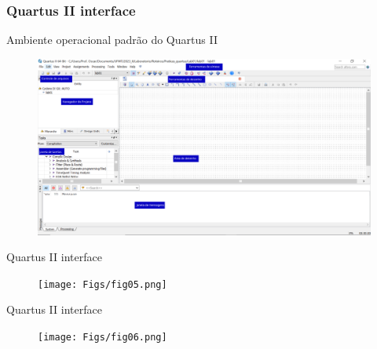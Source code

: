 \documentclass{CPSPresentation}
\begin{document}
\begin{frame}
	\frametitle{Quartus II interface}
	
	\begin{block}{}
		\justifying
		Ambiente operacional padrão do Quartus II
	\end{block}
	
	\begin{figure}[h]
		\centering
		\includegraphics[width=1.02\textwidth]{quartus/fig04.pdf}
	\end{figure}
	
	
\end{frame}
\begin{frame}{Quartus II interface}
	\justifying
	
	\begin{figure}[h]
			\centering
			\texttt{[image: Figs/fig05.png]}
		\end{figure}
	
	
\end{frame}
\begin{frame}{Quartus II interface}
	\justifying
	
	\begin{figure}[h]
			\centering
			\texttt{[image: Figs/fig06.png]}
		\end{figure}
	
	
\end{frame}
\end{document}
